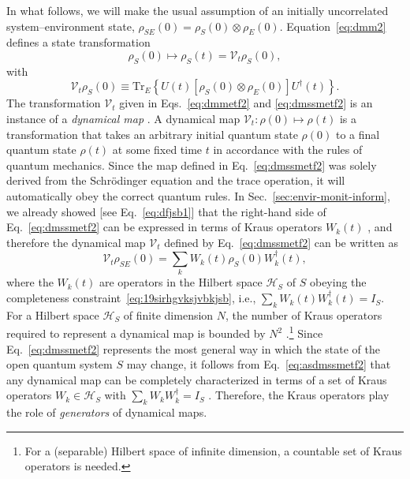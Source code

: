 \documentclass[3p,sort&compress]{elsarticle}
\newcommand{\op}[1]{#1}
\begin{document}
In what follows, we will make the usual assumption of an initially uncorrelated system--environment state, $\op{\rho}_{SE}(0)=\op{\rho}_{S}(0)\otimes \op{\rho}_{E}(0)$. Equation~\eqref{eq:dmm2} defines a state transformation
%
\begin{equation}
\label{eq:dmmetf2}
\op{\rho}_{S}(0) \mapsto \op{\rho}_S(t) = \mathcal{V}_t \op{\rho}_{S}(0),
\end{equation}
%
with 
%
\begin{equation}
  \label{eq:dmssmetf2}
\mathcal{V}_t \op{\rho}_{S}(0) \equiv \text{Tr}_{E} \left\{ U(t) \left[\op{\rho}_{S}(0)\otimes \op{\rho}_{E}(0) \right]U^\dagger(t) \right\}.
\end{equation}
%
The transformation $\mathcal{V}_t$ given in Eqs.~\eqref{eq:dmmetf2} and \eqref{eq:dmssmetf2} is an instance of a \emph{dynamical map} \cite{Breuer:2002:oq,Alicki:2007:uu}. A dynamical map $\mathcal{V}_t : \op{\rho}(0) \mapsto \op{\rho}(t)$ is a transformation that takes an arbitrary initial quantum state $\op{\rho}(0)$ to a final quantum state $\op{\rho}(t)$ at some fixed time $t$ in accordance with the rules of quantum mechanics. Since the map defined in Eq.~\eqref{eq:dmssmetf2} was solely derived from the Schr\"odinger equation and the trace operation, it will automatically obey the correct quantum rules. In Sec.~\ref{sec:envir-monit-inform}, we already showed [see Eq.~\eqref{eq:dfjsb1}] that the right-hand side of Eq.~\eqref{eq:dmssmetf2} can be expressed in terms of Kraus operators $\op{W}_k(t)$ \cite{Kraus:1971:ii,Kraus:1983:ee}, and therefore the dynamical map $\mathcal{V}_t$ defined by Eq.~\eqref{eq:dmssmetf2} can be written as
%
\begin{equation}
  \label{eq:asdmssmetf2}
\mathcal{V}_t \op{\rho}_{SE}(0) = \sum_k W_k(t) \op{\rho}_S(0) W^\dagger_k(t),
\end{equation}
%
where the $\op{W}_k(t)$ are operators in the Hilbert space $\mathcal{H}_S$ of $S$ obeying the completeness constraint~\eqref{eq:19sirhgvksjvbkjsb}, i.e.,
$\sum_k W_k(t) W^\dagger_k(t) = I_S$. For a Hilbert space $\mathcal{H}_S$ of finite dimension $N$, the number of Kraus operators required to represent a dynamical map is bounded by $N^2$ \cite{Alicki:2007:uu}.\footnote{For a (separable) Hilbert space of infinite dimension, a countable set of Kraus operators is needed.} Since Eq.~\eqref{eq:dmssmetf2} represents the most general way in which the state of the open quantum system $S$ may change, it follows from Eq.~\eqref{eq:asdmssmetf2} that any dynamical map can be completely characterized in terms of a set of Kraus operators $\op{W}_k \in \mathcal{H}_S$ with $\sum_k W_k W^\dagger_k = I_S$ \cite{Kraus:1983:ee,Lindblad:1976:um,Breuer:2002:oq,Alicki:2007:uu}. Therefore, the Kraus operators play the role of \emph{generators} of dynamical maps.
\end{document}
